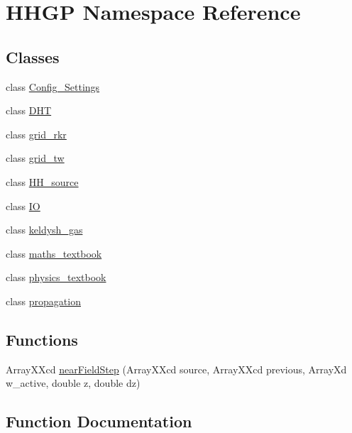 \hypertarget{namespace_h_h_g_p}{}\section{H\+H\+GP Namespace Reference}
\label{namespace_h_h_g_p}
\subsection*{Classes}
\begin{DoxyCompactItemize}
\item 
class \hyperlink{class_h_h_g_p_1_1_config___settings}{Config\+\_\+\+Settings}
\item 
class \hyperlink{class_h_h_g_p_1_1_d_h_t}{D\+HT}
\item 
class \hyperlink{class_h_h_g_p_1_1grid__rkr}{grid\+\_\+rkr}
\item 
class \hyperlink{class_h_h_g_p_1_1grid__tw}{grid\+\_\+tw}
\item 
class \hyperlink{class_h_h_g_p_1_1_h_h__source}{H\+H\+\_\+source}
\item 
class \hyperlink{class_h_h_g_p_1_1_i_o}{IO}
\item 
class \hyperlink{class_h_h_g_p_1_1keldysh__gas}{keldysh\+\_\+gas}
\item 
class \hyperlink{class_h_h_g_p_1_1maths__textbook}{maths\+\_\+textbook}
\item 
class \hyperlink{class_h_h_g_p_1_1physics__textbook}{physics\+\_\+textbook}
\item 
class \hyperlink{class_h_h_g_p_1_1propagation}{propagation}
\end{DoxyCompactItemize}
\subsection*{Functions}
\begin{DoxyCompactItemize}
\item 
Array\+X\+Xcd \hyperlink{namespace_h_h_g_p_a7cf02cbc90259051a40da992c053a004}{near\+Field\+Step} (Array\+X\+Xcd source, Array\+X\+Xcd previous, Array\+Xd w\+\_\+active, double z, double dz)
\end{DoxyCompactItemize}


\subsection{Function Documentation}
\mbox{\label{namespace_h_h_g_p_a7cf02cbc90259051a40da992c053a004}} 
